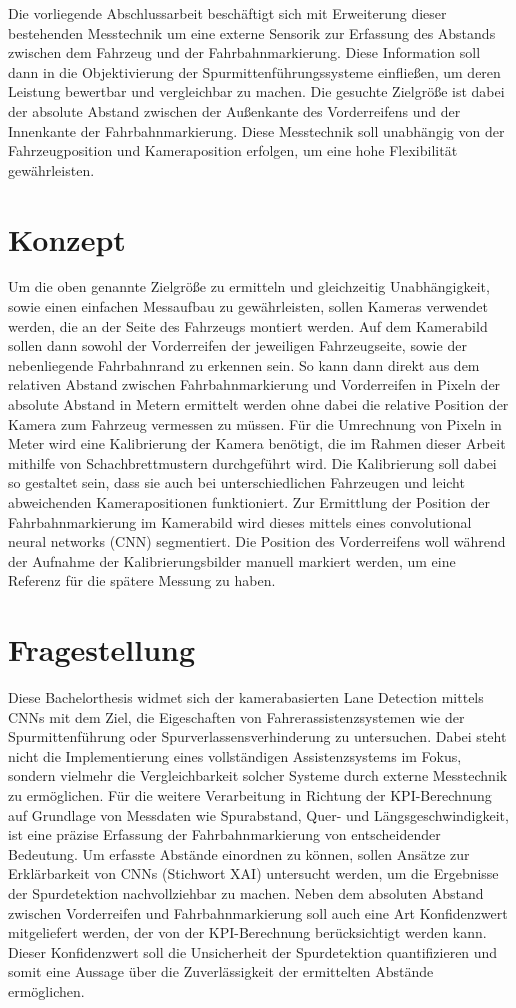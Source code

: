 Die vorliegende Abschlussarbeit beschäftigt sich mit Erweiterung dieser bestehenden Messtechnik um eine externe Sensorik zur Erfassung des Abstands zwischen dem Fahrzeug und der Fahrbahnmarkierung. Diese Information soll dann in die Objektivierung der Spurmittenführungssysteme einfließen, um deren Leistung bewertbar und vergleichbar zu machen. Die gesuchte Zielgröße ist dabei der absolute Abstand zwischen der Außenkante des Vorderreifens und der Innenkante der Fahrbahnmarkierung. Diese Messtechnik soll unabhängig von der Fahrzeugposition und Kameraposition erfolgen, um eine hohe Flexibilität gewährleisten.

\section{Konzept}
Um die oben genannte Zielgröße zu ermitteln und gleichzeitig Unabhängigkeit, sowie einen einfachen Messaufbau zu gewährleisten, sollen Kameras verwendet werden, die an der Seite des Fahrzeugs montiert werden. Auf dem Kamerabild sollen dann sowohl der Vorderreifen der jeweiligen Fahrzeugseite, sowie der nebenliegende Fahrbahnrand zu erkennen sein.
So kann dann direkt aus dem relativen Abstand zwischen Fahrbahnmarkierung und Vorderreifen in Pixeln der absolute Abstand in Metern ermittelt werden ohne dabei die relative Position der Kamera zum Fahrzeug vermessen zu müssen.
Für die Umrechnung von Pixeln in Meter wird eine Kalibrierung der Kamera benötigt, die im Rahmen dieser Arbeit mithilfe von Schachbrettmustern durchgeführt wird. Die Kalibrierung soll dabei so gestaltet sein, dass sie auch bei unterschiedlichen Fahrzeugen und leicht abweichenden Kamerapositionen funktioniert.
Zur Ermittlung der Position der Fahrbahnmarkierung im Kamerabild wird dieses mittels eines convolutional neural networks (CNN) segmentiert. Die Position des Vorderreifens woll während der Aufnahme der Kalibrierungsbilder manuell markiert werden, um eine Referenz für die spätere Messung zu haben. 

\section{Fragestellung}
Diese Bachelorthesis widmet sich der kamerabasierten Lane Detection mittels CNNs mit dem Ziel, die Eigeschaften von Fahrerassistenzsystemen wie der Spurmittenführung oder Spurverlassensverhinderung zu untersuchen. Dabei steht nicht die Implementierung eines vollständigen Assistenzsystems im Fokus, sondern vielmehr die Vergleichbarkeit solcher Systeme durch externe Messtechnik zu ermöglichen.
Für die weitere Verarbeitung in Richtung der KPI-Berechnung auf Grundlage von Messdaten wie Spurabstand, Quer- und Längsgeschwindigkeit, ist eine präzise Erfassung der Fahrbahnmarkierung von entscheidender Bedeutung. Um erfasste Abstände einordnen zu können, sollen Ansätze zur Erklärbarkeit von CNNs (Stichwort XAI) untersucht werden, um die Ergebnisse der Spurdetektion nachvollziehbar zu machen. Neben dem absoluten Abstand zwischen Vorderreifen und Fahrbahnmarkierung soll auch eine Art Konfidenzwert mitgeliefert werden, der von der KPI-Berechnung berücksichtigt werden kann. Dieser Konfidenzwert soll die Unsicherheit der Spurdetektion quantifizieren und somit eine Aussage über die Zuverlässigkeit der ermittelten Abstände ermöglichen.